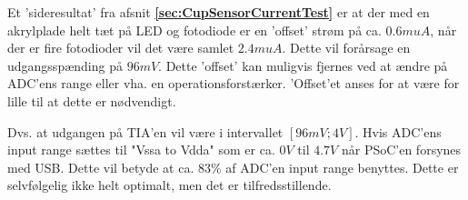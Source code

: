 \documentclass[HardwareDesign/HardwareDesign_main.tex]{subfiles}
\begin{document}
Et 'sideresultat' fra afsnit \textbf{\ref{sec:CupSensorCurrentTest}} er at der med en akrylplade helt tæt på LED og fotodiode er en 'offset' strøm på ca. $0.6\si{mu A}$, når der er fire fotodioder vil det være samlet $2.4\si{mu A}$. Dette vil forårsage en udgangsspænding på $96\si{mV}$. Dette 'offset' kan muligvis fjernes ved at ændre på ADC'ens range eller vha. en operationsforstærker. 'Offset'et anses for at være for lille til at dette er nødvendigt.

Dvs. at udgangen på TIA'en vil være i intervallet $[96\si{mV};4\si{V}]$. Hvis ADC'ens input range sættes til "Vssa to Vdda" som er ca. $0\si{V}$ til $4.7\si{V}$ når PSoC'en forsynes med USB. Dette vil betyde at ca. $83\%$ af ADC'en input range benyttes. Dette er selvfølgelig ikke helt optimalt, men det er tilfredsstillende.
\end{document}
